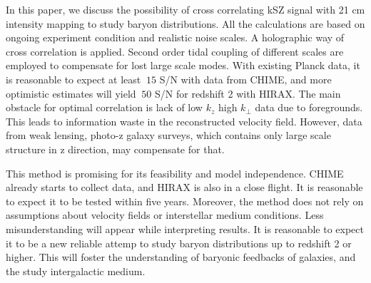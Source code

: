 In this paper, we discuss the possibility of cross correlating kSZ signal with 
21 cm intensity mapping to study baryon distributions. 
All the calculations are based on ongoing experiment condition and realistic noise scales. 
A holographic way of cross correlation is applied. 
Second order tidal coupling of different scales are employed to compensate for 
lost large scale modes. 
With existing Planck data, 
it is reasonable to expect at least $~15$ S/N with data from CHIME, 
and more optimistic estimates will yield $~50$ S/N for redshift 2 with HIRAX. 
The main obstacle for optimal correlation 
is lack of low $k_z$ high $k_\perp$ data due to foregrounds. 
This leads to information waste in the reconstructed velocity field. 
However, data from weak lensing, photo-z galaxy surveys, which 
contains only large scale structure in z direction, may 
compensate for that. 
 
This method is promising for its feasibility and model independence. 
CHIME already starts to collect data, 
and HIRAX is also in a close flight. 
It is reasonable to expect it to be tested within five years. 
Moreover, the method does not rely on assumptions about velocity fields 
or interstellar medium conditions. 
Less misunderstanding will appear while interpreting results. 
It is reasonable to expect it to be a new 
reliable attemp to study baryon distributions up to 
redshift 2 or higher. 
This will foster the understanding of baryonic feedbacks of galaxies, 
and the study intergalactic medium.
